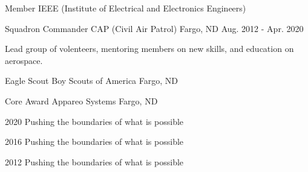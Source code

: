 

\begin{cventries}

  \cventry
    {Member} %
    {IEEE (Institute of Electrical and Electronics Engineers)} %
    {} %
    {} %
    {
      \begin{cvitems} %
      \end{cvitems}
    }

  \cventry
    {Squadron Commander} %
    {CAP (Civil Air Patrol)} %
    {Fargo, ND} %
    {Aug. 2012 - Apr. 2020} %
    {
      \begin{cvitems} %
        \item {Lead group of volenteers, mentoring members on new skills, and education on aerospace.}
      \end{cvitems}
    }

  \cventry
    {Eagle Scout} %
    {Boy Scouts of America} %
    {Fargo, ND} %
    {} %
    {
      \begin{cvitems} %
      \end{cvitems}
    }

  \cventry
    {Core Award} %
    {Appareo Systems} %
    {Fargo, ND} %
    {} %
    {
      \begin{cvitems} %
        \item {2020 Pushing the boundaries of what is possible}
        \item {2016 Pushing the boundaries of what is possible}
        \item {2012 Pushing the boundaries of what is possible}
      \end{cvitems}
    }

\end{cventries}
